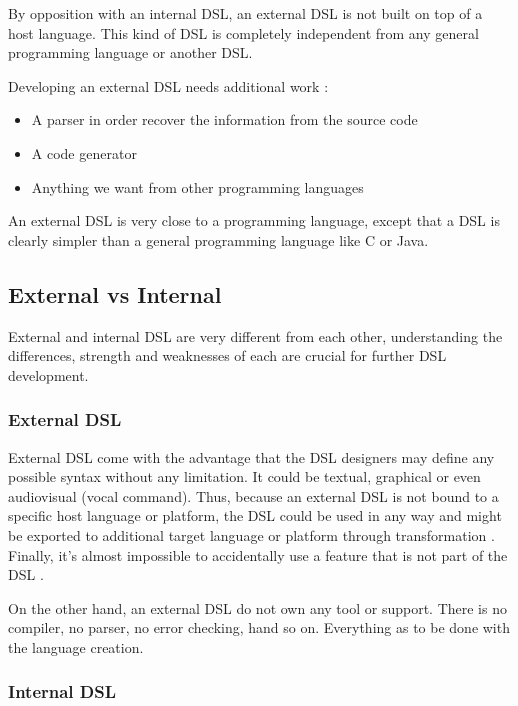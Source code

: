 By opposition with an internal \gls{DSL}, an external \gls{DSL} is not built on
top of a host language. This kind of \gls{DSL} is completely independent from
any general programming language or another \gls{DSL}.

Developing an external \gls{DSL} needs additional work :
\begin{itemize}
\item A parser in order recover the information from the source code
\item A code generator
\item Anything we want from other programming languages
\end{itemize}

An external \gls{DSL} is very close to a programming language, except that a
\gls{DSL} is clearly simpler than a general programming language like C or Java.

\subsection{External vs Internal}
\label{sec:external_vs_internal}

External and internal \gls{DSL} are very different from each other,
understanding the differences, strength and weaknesses of each are crucial for
further \gls{DSL} development.

\subsubsection{External \gls{DSL}}
\label{subsubsec:external_dsl}

External \gls{DSL} come with the advantage that the \gls{DSL} designers may
define any possible syntax without any limitation\cite{strembeckmarkzdunuwe2009}. It could be textual,
graphical or even audiovisual (vocal command). Thus, because an external
\gls{DSL} is not bound to a specific host language or platform, the \gls{DSL}
could be used in any way and might be exported to additional target language or
platform through transformation \cite{strembeckmarkzdunuwe2009}. Finally, it’s
almost impossible to accidentally use a feature that is not part of the \gls{DSL}
\cite{strembeckmarkzdunuwe2009}.

On the other hand, an external \gls{DSL} do not own any tool or support. There
is no compiler, no parser, no error checking, hand so on. Everything as to be done
with the language creation.

\subsubsection{Internal \gls{DSL}}
\label{subsubsec:internal_dsl}

